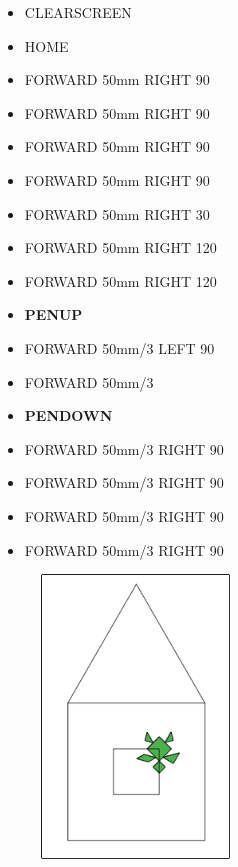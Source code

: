 \begin{scriptsize}
\begin{minipage}{0.40\textwidth}
\begin{itemize}[itemsep=-3pt,parsep=2pt]
\item[] CLEARSCREEN             
\item[] HOME
\item[] FORWARD 50mm RIGHT 90
\item[] FORWARD 50mm RIGHT 90
\item[] FORWARD 50mm RIGHT 90
\item[] FORWARD 50mm RIGHT 90
\item[] FORWARD 50mm RIGHT 30
\item[] FORWARD 50mm RIGHT 120
\item[] FORWARD 50mm RIGHT 120
\item[] \textbf{PENUP}
\item[] FORWARD 50mm/3 LEFT 90
\item[] FORWARD 50mm/3
\item[] \textbf{PENDOWN}
\item[] FORWARD 50mm/3 RIGHT 90
\item[] FORWARD 50mm/3 RIGHT 90
\item[] FORWARD 50mm/3 RIGHT 90
\item[] FORWARD 50mm/3 RIGHT 90
\end{itemize}
\end{minipage}
\end{scriptsize}
\begin{minipage}{0.4\textwidth}
\begin{figure}[H]
   \includegraphics[width=5.0cm,trim=4 4 8 4,clip]{./images/disegnare/disegnare-9.png}
   \label{dis-9}
\end{figure}
\end{minipage} \hfill

